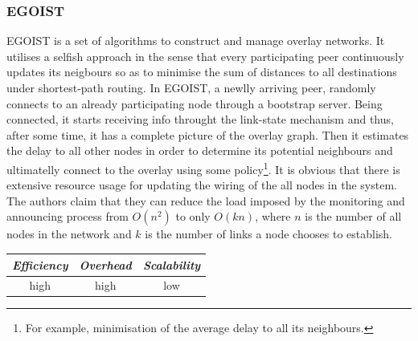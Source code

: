 \subsubsection{EGOIST}
EGOIST \cite{SLLBBR2008} is a set of algorithms to construct and manage overlay
networks. It utilises a selfish approach in the sense that every participating
peer continuously updates its neigbours so as to minimise the sum of distances
to all destinations under shortest-path routing. In EGOIST, a newlly arriving
peer, randomly connects to an already participating node through a bootstrap
server. Being connected, it starts receiving info throught the link-state
mechanism and thus, after some time, it has a complete picture of the overlay
graph. Then it estimates the delay to all other nodes in order to determine its
potential neighbours and ultimatelly connect to the overlay using some
policy\footnote{For example, minimisation of the average delay to all its
neighbours.}. It is obvious that there is extensive resource usage for updating
the wiring of the all nodes in the system. The authors claim that they can
reduce the load imposed by the monitoring and announcing process from $O(n^2)$
to only $O(kn)$, where $n$ is the number of all nodes in the network and $k$ is
the number of links a node chooses to establish.

\begin{center}
\begin{tabular}{ccc}
\emph{Efficiency} & \emph{Overhead} & \emph{Scalability} \\
\hline
high &
high &
low
\end{tabular}
\end{center}

